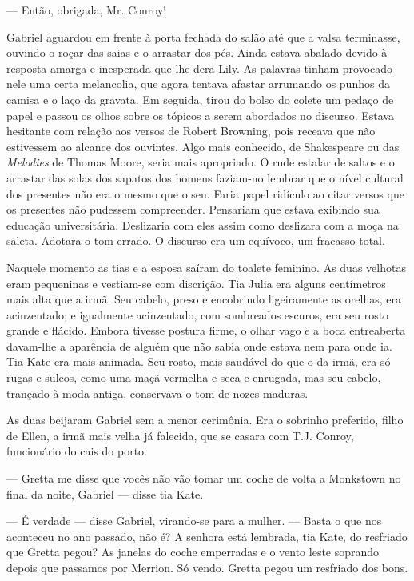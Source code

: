 --- Então, obrigada, Mr. Conroy!

Gabriel aguardou em frente à porta fechada do salão até que a valsa
terminasse, ouvindo o roçar das saias e o arrastar dos pés. Ainda
estava abalado devido à resposta amarga e inesperada que lhe dera
Lily. As palavras tinham provocado nele uma certa melancolia, que
agora tentava afastar arrumando os punhos da camisa e o laço da
gravata. Em seguida, tirou do bolso do colete
um pedaço de papel e passou os olhos sobre os tópicos a serem
abordados no discurso. Estava hesitante com relação aos versos de
Robert Browning, pois receava que não estivessem ao alcance dos
ouvintes. Algo mais conhecido, de Shakespeare ou das \textit{Melodies} de
Thomas Moore, seria mais apropriado. O rude estalar de saltos e o
arrastar das solas dos sapatos dos homens faziam-no lembrar que o
nível cultural dos presentes não era o mesmo que o seu. Faria papel
ridículo ao citar versos que os presentes não pudessem compreender.
Pensariam que estava exibindo sua educação universitária. Deslizaria
com eles assim como deslizara com a moça na saleta. Adotara o tom
errado. O discurso era um equívoco, um fracasso total.

Naquele momento as tias e a esposa saíram do toalete feminino. As
duas velhotas eram pequeninas e vestiam-se com discrição. Tia Julia
era alguns centímetros mais alta que a irmã. Seu cabelo, preso e
encobrindo ligeiramente as orelhas, era acinzentado; e igualmente
acinzentado, com sombreados escuros, era seu rosto grande e flácido.
Embora tivesse postura firme, o olhar vago e a boca entreaberta
davam-lhe a aparência de alguém que não sabia onde estava nem para
onde ia. Tia Kate era mais animada. Seu rosto, mais saudável do que o
da irmã, era só rugas e sulcos, como uma maçã vermelha e seca e
enrugada, mas seu cabelo, trançado à moda antiga, conservava o tom de
nozes maduras.

As duas beijaram Gabriel sem a menor cerimônia. Era o sobrinho
preferido, filho de Ellen, a irmã mais velha já falecida, que se
casara com T.J. Conroy, funcionário do cais do porto.

--- Gretta me disse que vocês não vão tomar um coche de volta a
Monkstown no final da noite, Gabriel --- disse tia Kate.

--- É verdade --- disse Gabriel, virando-se para a mulher. --- Basta o
que nos aconteceu no ano passado, não é? A senhora está lembrada, tia
Kate, do resfriado que Gretta pegou? As janelas do coche emperradas e
o vento leste soprando depois que passamos por Merrion. Só vendo.
Gretta pegou um resfriado dos bons.

